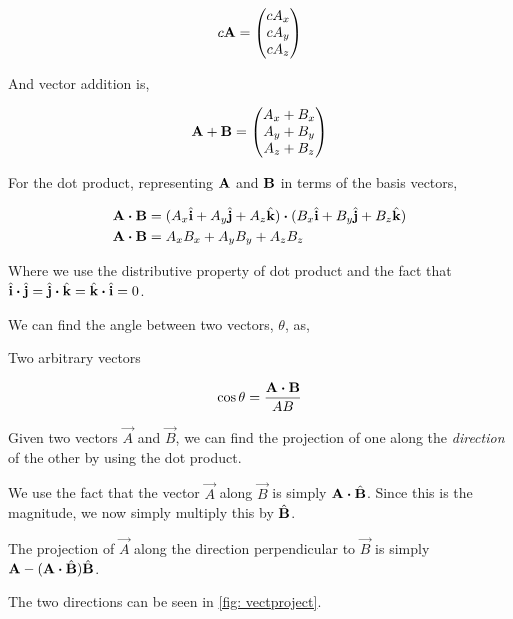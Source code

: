 \[
    c\boldsymbol{\mathbf{A}} = 
    \begin{pmatrix}
        cA_x \\
        cA_y \\
        cA_z
    \end{pmatrix}
\]

And vector addition is,

\[
    \boldsymbol{\mathbf{A}} + \boldsymbol{\mathbf{B}} = 
    \begin{pmatrix}
        A_x + B_x\\
        A_y + B_y\\
        A_z + B_z 
    \end{pmatrix}
\]

For the dot product, representing \(\boldsymbol{\mathbf{A}}\) and \(\boldsymbol{\mathbf{B}}\) in terms of the basis vectors,

\begin{align*}
    \Aa \dtp \BB &= (A_x \unitv{i} + A_y \unitv{j} + A_z \unitv{k}) \dtp (B_x \unitv{i} + B_y \unitv{j} + B_z \unitv{k}) \\
    \Aa \dtp \BB &= A_xB_x + A_yB_y + A_zB_z
\end{align*}

Where we use the distributive property of dot product and the fact 
that \(\unitv{i} \dtp \unitv{j} = \unitv{j} \dtp \unitv{k} = \unitv{k} \dtp \unitv{i} = 0\).

We can find the angle between two vectors, \(\theta\), as,

\begin{marginfigure}
    \centering
    \caption{Two arbitrary vectors}
\end{marginfigure}

\begin{equation*}
    \cos\theta = \frac{\vec{A} \dtp \vec{B}}{AB}
\end{equation*}

Given two vectors \(\vec{A}\) and \(\vec{B}\), we can find the projection of one along the \emph{direction} of 
the other by using the dot product.

We use the fact that the vector \(\vec{A}\) along \(\vec{B}\) is simply 
\(\vec{A} \dtp \unitv{B}\). Since this is the magnitude, we now simply 
multiply this by \(\hat{\boldsymbol{\mathbf{B}}}\). 

The projection of \(\vec{A}\) along the direction perpendicular
to \(\vec{B}\) is simply \(\vec{A} - (\vec{A} \dtp \unitv{B})\unitv{B}\). 

The two directions can be seen in \cref{fig: vectproject}.

